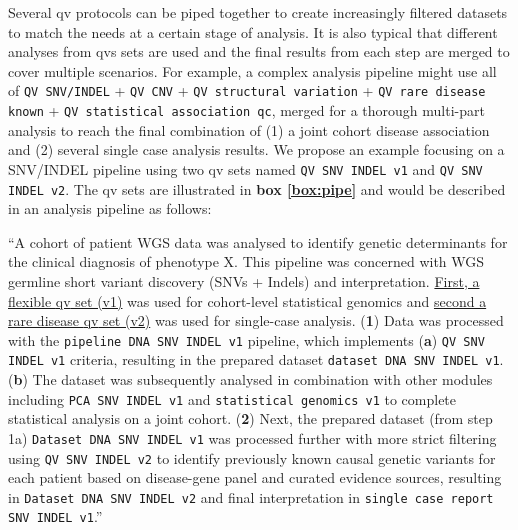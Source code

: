Several \ac{qv} protocols can be piped together to create increasingly filtered datasets to match the needs at a certain stage of analysis. It is also typical that different analyses from \ac{qv}s sets are used and the final results from each step are merged to cover multiple scenarios. For example, a complex analysis pipeline might use all of
\colorbox{kispiblue!30}{\texttt{QV SNV/INDEL}} + 
\colorbox{kispiblue!30}{\texttt{QV CNV}} + 
\colorbox{kispiblue!30}{\texttt{QV structural variation}} + 
\colorbox{kispiblue!30}{\texttt{QV rare disease known}} + 
\colorbox{kispiblue!30}{\texttt{QV statistical association \ac{qc}}}, merged for a thorough multi-part analysis to reach the final combination of (1) a joint cohort disease association and (2) several single case analysis results.
We propose an example focusing on a SNV/INDEL pipeline using two \ac{qv} sets named 
\colorbox{colorSUNSET2!60}{\texttt{QV SNV INDEL v1}} and
\colorbox{colorSUNSET2!60}{\texttt{QV SNV INDEL v2}}.
The \ac{qv} sets are illustrated in 
\textbf{box \ref{box:pipe}}
and would be described in an analysis pipeline as follows:

``A cohort of patient WGS data was analysed to identify genetic determinants for the clinical diagnosis of phenotype X. 
This pipeline was concerned with WGS germline short variant discovery (SNVs + Indels) and interpretation.
\underline{First, a flexible \ac{qv} set (v1)} was used for cohort-level statistical genomics and \underline{second a rare disease \ac{qv} set (v2)} was used for single-case analysis.
(\textbf{1}) Data was processed with the 
\colorbox{colorSUNSET1!30}{\texttt{pipeline DNA SNV INDEL v1}} pipeline, which implements
(\textbf{a}) \colorbox{colorSUNSET2!60}{\texttt{QV SNV INDEL v1}} criteria, resulting in the prepared dataset
\colorbox{colorSUNSET3!30}{\texttt{dataset DNA SNV INDEL v1}}.
(\textbf{b}) The dataset was subsequently analysed in combination with other modules including 
\colorbox{colorSUNSET4!30}{\texttt{PCA SNV INDEL v1}} and 
\colorbox{colorSUNSET5!30}{\texttt{statistical genomics v1}} to complete statistical analysis on a joint cohort.
(\textbf{2}) Next, 
 the prepared dataset (from step 1a)
\colorbox{colorSUNSET3!30}{\texttt{Dataset DNA SNV INDEL v1}} was processed further with more strict filtering using
\colorbox{colorSUNSET2!60}{\texttt{QV SNV INDEL v2}} to identify previously known causal genetic variants for each patient based on disease-gene panel and curated evidence sources, resulting in \colorbox{colorSUNSET3!30}{\texttt{Dataset DNA SNV INDEL v2}} and final interpretation in
\colorbox{colorSUNSET5!30}{\texttt{single case report SNV INDEL v1}}.''

